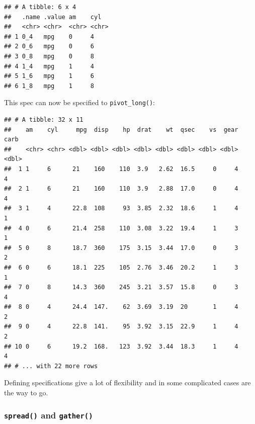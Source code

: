 \documentclass[]{gitbook}
\newenvironment{Shaded}{\begin{snugshade}}{\end{snugshade}}
\newcommand{\DataTypeTok}[1]{\textcolor[rgb]{0.13,0.29,0.53}{#1}}
\newcommand{\KeywordTok}[1]{\textcolor[rgb]{0.13,0.29,0.53}{\textbf{#1}}}
\newcommand{\NormalTok}[1]{#1}
\newcommand{\OperatorTok}[1]{\textcolor[rgb]{0.81,0.36,0.00}{\textbf{#1}}}
\newcommand{\OtherTok}[1]{\textcolor[rgb]{0.56,0.35,0.01}{#1}}
\newcommand{\StringTok}[1]{\textcolor[rgb]{0.31,0.60,0.02}{#1}}
\begin{document}
\begin{verbatim}
## # A tibble: 6 x 4
##   .name .value am    cyl  
##   <chr> <chr>  <chr> <chr>
## 1 0_4   mpg    0     4    
## 2 0_6   mpg    0     6    
## 3 0_8   mpg    0     8    
## 4 1_4   mpg    1     4    
## 5 1_6   mpg    1     6    
## 6 1_8   mpg    1     8
\end{verbatim}

This spec can now be specified to \texttt{pivot\_long()}:

\begin{Shaded}
\end{Shaded}

\begin{verbatim}
## # A tibble: 32 x 11
##    am    cyl     mpg  disp    hp  drat    wt  qsec    vs  gear  carb
##    <chr> <chr> <dbl> <dbl> <dbl> <dbl> <dbl> <dbl> <dbl> <dbl> <dbl>
##  1 1     6      21    160    110  3.9   2.62  16.5     0     4     4
##  2 1     6      21    160    110  3.9   2.88  17.0     0     4     4
##  3 1     4      22.8  108     93  3.85  2.32  18.6     1     4     1
##  4 0     6      21.4  258    110  3.08  3.22  19.4     1     3     1
##  5 0     8      18.7  360    175  3.15  3.44  17.0     0     3     2
##  6 0     6      18.1  225    105  2.76  3.46  20.2     1     3     1
##  7 0     8      14.3  360    245  3.21  3.57  15.8     0     3     4
##  8 0     4      24.4  147.    62  3.69  3.19  20       1     4     2
##  9 0     4      22.8  141.    95  3.92  3.15  22.9     1     4     2
## 10 0     6      19.2  168.   123  3.92  3.44  18.3     1     4     4
## # ... with 22 more rows
\end{verbatim}

Defining specifications give a lot of flexibility and in some complicated cases are the way to go.

\hypertarget{spread-and-gather}{%
\subsubsection{\texorpdfstring{\texttt{spread()} and \texttt{gather()}}{spread() and gather()}}\label{spread-and-gather}}
\end{document}

